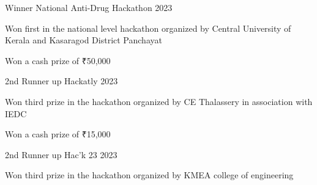 
\begin{cventries}
  \cventry
    {Winner} %
    {National Anti-Drug Hackathon} %
    {}
    {2023} %
    {
      \begin{cvitems}
          \item {Won first in the national level hackathon organized by Central University of Kerala and Kasaragod District Panchayat}
          \item {Won a cash prize of ₹50,000}
      \end{cvitems}
    }
    
  \cventry
    {2nd Runner up}
    {Hackatly}
    {}
    {2023}
    {
      \begin{cvitems}
          \item {Won third prize in the hackathon organized by CE Thalassery in association with IEDC}
          \item {Won a cash prize of ₹15,000}
      \end{cvitems}
    }
    
  \cventry
    {2nd Runner up}
    {Hac'k 23}
    {}
    {2023}
    {
      \begin{cvitems}
          \item {Won third prize in the hackathon organized by KMEA college of engineering}
      \end{cvitems}
    }
    
\end{cventries}